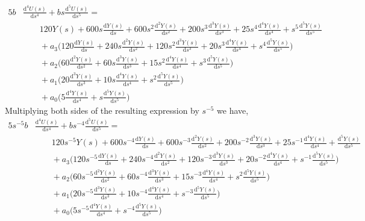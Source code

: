 \documentclass[letterpaper%
, twoside%
, 12pt%
,memoire%
, english%
,creativecommons,hyperref%
]{thETS}
\begin{document}
\begin{equation}\label{eqn.32}
\begin{split}
5b&\frac{\mathrm{d}^4U(s)}{\mathrm{d}s^4} + bs\frac{\mathrm{d}^5U(s)}{\mathrm{d}s^5} = \\ 
&\qquad{}120Y(s) + 600s\frac{\mathrm{d}Y(s)}{\mathrm{d}s} + 600s^2\frac{\mathrm{d}^2Y(s)}{\mathrm{d}s^2} + 200s^3\frac{\mathrm{d}^3Y(s)}{\mathrm{d}s^3} + 25s^4\frac{\mathrm{d}^4Y(s)}{\mathrm{d}s^4} + s^5 \frac{\mathrm{d}^5Y(s)}{\mathrm{d}s^5} \, \\
&\qquad{}+ a_3\bigg(120\frac{\mathrm{d}Y(s)}{\mathrm{d}s} + 240s\frac{\mathrm{d}^2Y(s)}{\mathrm{d}s^2} + 120s^2\frac{\mathrm{d}^3Y(s)}{\mathrm{d}s^3} + 20s^3\frac{\mathrm{d}^4Y(s)}{\mathrm{d}s^4} + s^4 \frac{\mathrm{d}^5Y(s)}{\mathrm{d}s^5}\bigg) \, \\
&\qquad{}+ a_2\bigg(60\frac{\mathrm{d}^2Y(s)}{\mathrm{d}s^2} + 60s\frac{\mathrm{d}^3Y(s)}{\mathrm{d}s^3} + 15s^2\frac{\mathrm{d}^4Y(s)}{\mathrm{d}s^4} + s^3\frac{\mathrm{d}^5Y(s)}{\mathrm{d}s^5} \bigg) \, \\  
&\qquad{}+ a_1\bigg(20\frac{\mathrm{d}^3Y(s)}{\mathrm{d}s^3} + 10s\frac{\mathrm{d}^4Y(s)}{\mathrm{d}s^4} + s^2\frac{\mathrm{d}^5Y(s)}{\mathrm{d}s^5} \bigg) \, \\
&\qquad{}+ a_0\bigg(5\frac{\mathrm{d}^4Y(s)}{\mathrm{d}s^4} + s\frac{\mathrm{d}^5Y(s)}{\mathrm{d}s^5} \bigg)
\end{split}
\end{equation}
Multiplying both sides of the resulting expression by $s^{-5}$ we have,
\begin{equation}\label{eqn.33}
\begin{split}
5s^{-5}b&\frac{\mathrm{d}^4U(s)}{\mathrm{d}s^4} + bs^{-4}\frac{\mathrm{d}^5U(s)}{\mathrm{d}s^5} = \\
&\qquad{}120s^{-5}Y(s) + 600s^{-4}\frac{\mathrm{d}Y(s)}{\mathrm{d}s} + 600s^{-3}\frac{\mathrm{d}^2Y(s)}{\mathrm{d}s^2} + 200s^{-2}\frac{\mathrm{d}^3Y(s)}{\mathrm{d}s^3} + 25s^{-1}\frac{\mathrm{d}^4Y(s)}{\mathrm{d}s^4} + \frac{\mathrm{d}^5Y(s)}{\mathrm{d}s^5} \, \\
&\qquad{}+ a_3\bigg(120s^{-5}\frac{\mathrm{d}Y(s)}{\mathrm{d}s} + 240s^{-4}\frac{\mathrm{d}^2Y(s)}{\mathrm{d}s^2} + 120s^{-3}\frac{\mathrm{d}^3Y(s)}{\mathrm{d}s^3} + 20s^{-2}\frac{\mathrm{d}^4Y(s)}{\mathrm{d}s^4} + s^{-1} \frac{\mathrm{d}^5Y(s)}{\mathrm{d}s^5}\bigg) \, \\
&\qquad{}+ a_2\bigg(60s^{-5}\frac{\mathrm{d}^2Y(s)}{\mathrm{d}s^2} + 60s^{-4}\frac{\mathrm{d}^3Y(s)}{\mathrm{d}s^3} + 15s^{-3}\frac{\mathrm{d}^4Y(s)}{\mathrm{d}s^4} + s^{2}\frac{\mathrm{d}^5Y(s)}{\mathrm{d}s^5} \bigg) \, \\  
&\qquad{}+ a_1\bigg(20s^{-5}\frac{\mathrm{d}^3Y(s)}{\mathrm{d}s^3} + 10s^{-4}\frac{\mathrm{d}^4Y(s)}{\mathrm{d}s^4} + s^{-3}\frac{\mathrm{d}^5Y(s)}{\mathrm{d}s^5} \bigg) \, \\
&\qquad{}+ a_0\bigg(5s^{-5}\frac{\mathrm{d}^4Y(s)}{\mathrm{d}s^4} + s^{-4}\frac{\mathrm{d}^5Y(s)}{\mathrm{d}s^5} \bigg)
\end{split}
\end{equation}
\end{document}
